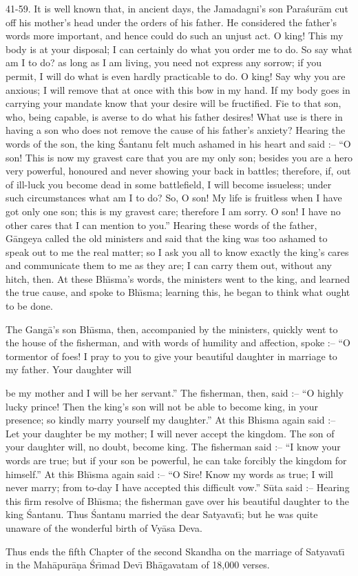 41-59. It is well known that, in ancient days, the Jamadagni's son Para\'sur\=am cut off his mother's head under the orders of his father. He considered the father's words more important, and hence could do such an unjust act. O king! This my body is at your disposal; I can certainly do what you order me to do. So say what am I to do? as long as I am living, you need not express any sorrow; if you permit, I will do what is even hardly practicable to do. O king! Say why you are anxious; I will remove that at once with this bow in my hand. If my body goes in carrying your mandate know that your desire will be fructified. Fie to that son, who, being capable, is averse to do what his father desires! What use is there in having a son who does not remove the cause of his father's anxiety? Hearing the words of the son, the king \'Santanu felt much ashamed in his heart and said :-- ``O son! This is now my gravest care that you are my only son; besides you are a hero very powerful, honoured and never showing your back in battles; therefore, if, out of ill-luck you become dead in some battlefield, I will become issueless; under such circumstances what am I to do? So, O son! My life is fruitless when I have got only one son; this is my gravest care; therefore I am sorry. O son! I have no other cares that I can mention to you.'' Hearing these words of the father, G\=angeya called the old ministers and said that the king was too ashamed to speak out to me the real matter; so I ask you all to know exactly the king's cares and communicate them to me as they are; I can carry them out, without any hitch, then. At these Bh\={\i}sma's words, the ministers went to the king, and learned the true cause, and spoke to Bh\={\i}sma; learning this, he began to think what ought to be done.

The Gang\=a's son Bh\={\i}sma, then, accompanied by the ministers, quickly went to the house of the fisherman, and with words of humility and affection, spoke :-- ``O tormentor of foes! I pray to you to give your beautiful daughter in marriage to my father. Your daughter will

be my mother and I will be her servant.'' The fisherman, then, said :-- ``O highly lucky prince! Then the king's son will not be able to become king, in your presence; so kindly marry yourself my daughter.'' At this Bhisma again said :-- Let your daughter be my mother; I will never accept the kingdom. The son of your daughter will, no doubt, become king. The fisherman said :-- ``I know your words are true; but if your son be powerful, he can take forcibly the kingdom for himself.'' At this Bh\={\i}sma again said :-- ``O Sire! Know my words as true; I will never marry; from to-day I have accepted this difficult vow.'' S\=uta said :-- Hearing this firm resolve of Bh\={\i}sma; the fisherman gave over his beautiful daughter to the king \'Santanu. Thus \'Santanu married the dear Satyavat\={\i}; but he was quite unaware of the wonderful birth of Vy\=asa Deva.

Thus ends the fifth Chapter of the second Skandha on the marriage of Satyavat\={\i} in the Mah\=apur\=a\d{n}a \'Sr\={\i}mad Dev\={\i} Bh\=agavatam of 18,000 verses.



